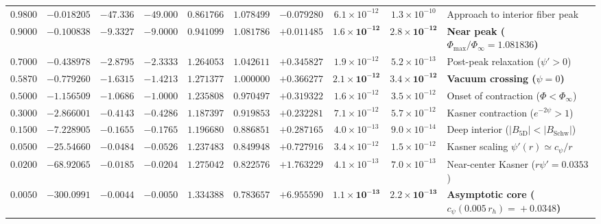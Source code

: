 \documentclass[11pt,a4paper]{article}
\theoremstyle{plain}
\theoremstyle{definition}
\theoremstyle{remark}
\numberwithin{equation}{section}
\begin{document}
\begin{table}[H]
\begin{tabularx}{\textwidth}{@{} c c c c c c c c c Y @{}}
    $0.9800$ & $-0.018205$ & $-47.336$  & $-49.000$  & $0.861766$ & $1.078499$ & $-0.079280$ & $6.1\!\times\!10^{-12}$ & $1.3\!\times\!10^{-10}$ & Approach to interior fiber peak \\
    $\mathbf{0.9000}$ & $\mathbf{-0.100838}$ & $\mathbf{-9.3327}$ & $\mathbf{-9.0000}$ & $\mathbf{0.941099}$ & $\mathbf{1.081786}$ & $\mathbf{+0.011485}$ & $\mathbf{1.6\!\times\!10^{-12}}$ & $\mathbf{2.8\!\times\!10^{-12}}$ & \textbf{Near peak ($\Phi_{\max}/\Phi_{\infty}\!=\!1.081836$)} \\
    $0.7000$ & $-0.438978$ & $-2.8795$  & $-2.3333$  & $1.264053$ & $1.042611$ & $+0.345827$ & $1.9\!\times\!10^{-12}$ & $5.2\!\times\!10^{-13}$ & Post-peak relaxation ($\psi' > 0$) \\
    $\mathbf{0.5870}$ & $\mathbf{-0.779260}$ & $\mathbf{-1.6315}$ & $\mathbf{-1.4213}$ & $\mathbf{1.271377}$ & $\mathbf{1.000000}$ & $\mathbf{+0.366277}$ & $\mathbf{2.1\!\times\!10^{-12}}$ & $\mathbf{3.4\!\times\!10^{-12}}$ & \textbf{Vacuum crossing ($\psi = 0$)} \\
    $0.5000$ & $-1.156509$ & $-1.0686$  & $-1.0000$  & $1.235808$ & $0.970497$ & $+0.319322$ & $1.6\!\times\!10^{-12}$ & $3.5\!\times\!10^{-12}$ & Onset of contraction ($\Phi < \Phi_{\infty}$) \\
    $0.3000$ & $-2.866001$ & $-0.4143$  & $-0.4286$  & $1.187397$ & $0.919853$ & $+0.232281$ & $7.1\!\times\!10^{-12}$ & $5.7\!\times\!10^{-12}$ & Kasner contraction ($e^{-2\psi} > 1$) \\
    $0.1500$ & $-7.228905$ & $-0.1655$  & $-0.1765$  & $1.196680$ & $0.886851$ & $+0.287165$ & $4.0\!\times\!10^{-13}$ & $9.0\!\times\!10^{-14}$ & Deep interior ($\vert B_{\text{5D}}\vert < \vert B_{\text{Schw}}\vert$) \\
    $0.0500$ & $-25.54660$ & $-0.0484$  & $-0.0526$  & $1.237483$ & $0.849948$ & $+0.727916$ & $3.4\!\times\!10^{-12}$ & $1.5\!\times\!10^{-12}$ & Kasner scaling $\psi'(r) \simeq c_{\psi}/r$ \\
    $0.0200$ & $-68.92065$ & $-0.0185$  & $-0.0204$  & $1.275042$ & $0.822576$ & $+1.763229$ & $4.1\!\times\!10^{-13}$ & $7.0\!\times\!10^{-13}$ & Near-center Kasner ($r\psi' = 0.0353$) \\
    $\mathbf{0.0050}$ & $\mathbf{-300.0991}$ & $\mathbf{-0.0044}$ & $\mathbf{-0.0050}$ & $\mathbf{1.334388}$ & $\mathbf{0.783657}$ & $\mathbf{+6.955590}$ & $\mathbf{1.1\!\times\!10^{-13}}$ & $\mathbf{2.2\!\times\!10^{-13}}$ & \textbf{Asymptotic core ($c_{\psi}(0.005\,r_h)\!=\!+0.0348$)} \\
    \bottomrule
  \end{tabularx}
\end{table}
\end{document}
